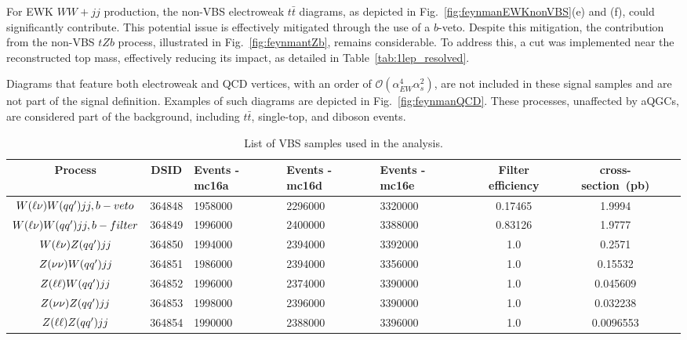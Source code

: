 For EWK $WW+jj$ production, the non-VBS electroweak $t\bar{t}$ diagrams, as depicted in Fig.~\ref{fig:feynmanEWKnonVBS}(e) and (f), could significantly contribute. This potential issue is effectively mitigated through the use of a $b$-veto. Despite this mitigation, the contribution from the non-VBS $tZb$ process, illustrated in Fig.~\ref{fig:feynmantZb}, remains considerable. To address this, a cut was implemented near the reconstructed top mass, effectively reducing its impact, as detailed in Table~\ref{tab:1lep_resolved}.

Diagrams that feature both electroweak and QCD vertices, with an order of $\mathcal{O}(\alpha_{EW}^{4} \alpha_s^{2})$, are not included in these signal samples and are not part of the signal definition.
Examples of such diagrams are depicted in Fig.~\ref{fig:feynmanQCD}. These processes, unaffected by aQGCs, are considered part of the background, including $t\bar{t}$, single-top, and diboson events.

\begin{table}[!htbp]
\begin{center}
\small
\caption{List of VBS samples used in the analysis.}
\begin{tabularx}{\textwidth}{|c|c|X|X|X|c|c|c|}
\hline
Process & DSID & Events - mc16a & Events - mc16d & Events - mc16e & Filter efficiency & cross-section~(pb) \\
\hline

$W(\ell\nu)W(q q^{\prime}) jj, b-veto$    & 364848   &   1958000 &  2296000 & 3320000 & 0.17465  &  1.9994  \\
$W(\ell\nu)W(q q^{\prime}) jj, b-filter$  & 364849   &   1996000 &  2400000 & 3388000 & 0.83126  &  1.9777  \\
$W(\ell\nu)Z(q q^{\prime}) jj$            & 364850   &   1994000 &  2394000 & 3392000 & 1.0  &  0.2571  \\
$Z(\nu\nu)W(q q^{\prime}) jj$            & 364851   &   1986000 &  2394000 & 3356000 & 1.0  &  0.15532  \\
$Z(\ell\ell)W(q q^{\prime}) jj$            & 364852   &   1996000 &  2374000 & 3390000 & 1.0  &  0.045609  \\
$Z(\nu\nu)Z(q q^{\prime}) jj$            & 364853   &   1998000 &  2396000 & 3390000 & 1.0  &  0.032238  \\
$Z(\ell\ell)Z(q q^{\prime}) jj$            & 364854   &   1990000 &  2388000 & 3396000 & 1.0  &  0.0096553  \\

\hline
\end{tabularx}
\label{tab:VBS_sig_samples}
\end{center}
\end{table}

